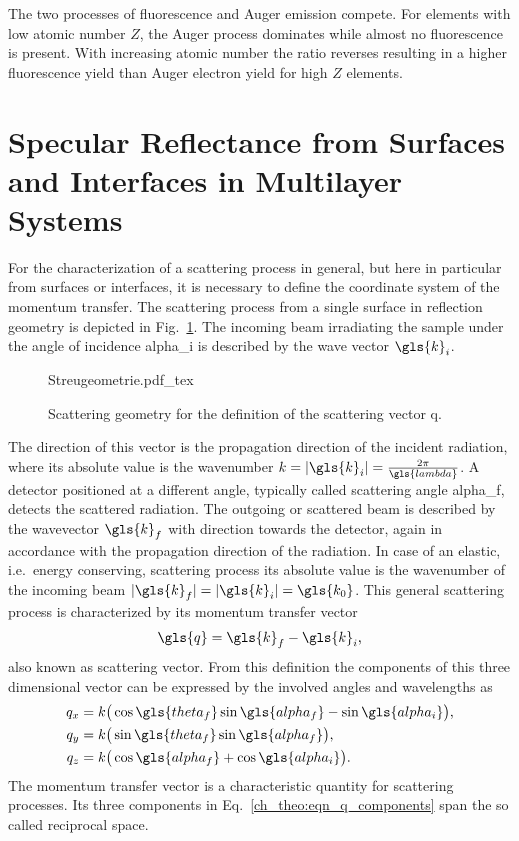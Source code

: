 The two processes of fluorescence and Auger emission compete. For elements with low atomic number $Z$, the Auger process dominates while almost no fluorescence is present. With increasing atomic number the ratio reverses resulting in a higher fluorescence yield than Auger electron yield for high $Z$ elements.

\section{Specular Reflectance from Surfaces and Interfaces in Multilayer Systems}
For the characterization of a scattering process in general, but here in particular from surfaces or interfaces, it is necessary to define the coordinate system of the momentum transfer. The scattering process from a single surface in reflection geometry is depicted in Fig.~\ref{ch_theo:fig_scattering_process}. The incoming beam irradiating the sample under the angle of incidence \gls{alpha_i} is described by the wave vector $\gls{k}_i$.
\begin{figure}[htb]
    {Streugeometrie.pdf_tex}
    \caption[Scattering geometry and definition of the scattering vector.]{Scattering geometry for the definition of the scattering vector \gls{q}.}
    \label{ch_theo:fig_scattering_process}
\end{figure}
The direction of this vector is the propagation direction of the incident radiation, where its absolute value is the wavenumber $k = |\gls{k}_i| = \frac{2 \pi}{\gls{lambda}}$. A detector positioned at a different angle, typically called scattering angle \gls{alpha_f}, detects the scattered radiation. The outgoing or scattered beam is described by the wavevector $\gls{k}_f$ with direction towards the detector, again in accordance with the propagation direction of the radiation. In case of an elastic, i.e.~energy conserving, scattering process its absolute value is the wavenumber of the incoming beam $|\gls{k}_f| = |\gls{k}_i| = \gls{k_0}$. This general scattering process is characterized by its momentum transfer vector 
\begin{align}
\gls{q} = \gls{k}_f - \gls{k}_i\text{,} \label{ch:theo_eqn:q}
\end{align}
also known as scattering vector. From this definition the components of this three dimensional vector can be expressed by the involved angles and wavelengths as
\begin{align}\begin{split}
q_x &= k \big( \cos \gls{theta_f} \sin \gls{alpha_f} - \sin \gls{alpha_i}\big)\text{,}\\
q_y &= k \big( \sin \gls{theta_f} \sin \gls{alpha_f}\big)\text{,}\\
q_z &= k \big( \cos \gls{alpha_f} + \cos \gls{alpha_i}\big)\text{.}
\end{split} \label{ch_theo:eqn_q_components}
\end{align}
The momentum transfer vector is a characteristic quantity for scattering processes. Its three components in Eq.~\eqref{ch_theo:eqn_q_components} span the so called reciprocal space.

